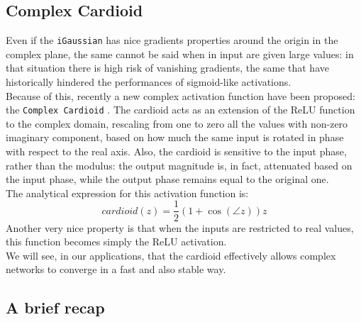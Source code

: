 \documentclass[../main.tex]{subfiles}
\begin{document}
\subsection*{Complex Cardioid}
Even if the \texttt{iGaussian} has nice gradients properties around the origin in the complex plane, the same cannot be said when in input are given large values: in that situation there is high risk of vanishing gradients, the same that have historically hindered the performances of sigmoid-like activations.\\
Because of this, recently a new complex activation function have been proposed: the \texttt{Complex Cardioid} \cite{Virtue:EECS-2019-126}. The cardioid acts as an extension of the ReLU function to the complex domain, rescaling from one to zero all the values with non-zero imaginary component, based on how much the same input is rotated in phase with respect to the real axis. Also, the cardioid is sensitive to the input phase, rather than the modulus: the output magnitude is, in fact, attenuated based on the input phase, while the output phase remains equal to the original one.\\
The analytical expression for this activation function is:
\[ cardioid(z) = \frac{1}{2}\left(1 + \cos(\angle z)\right)z \]
Another very nice property is that when the inputs are restricted to real values, this function becomes simply the ReLU activation.\\
We will see, in our applications, that the cardioid effectively allows complex networks to converge in a fast and also stable way.

\subsection*{A brief recap}
\end{document}
